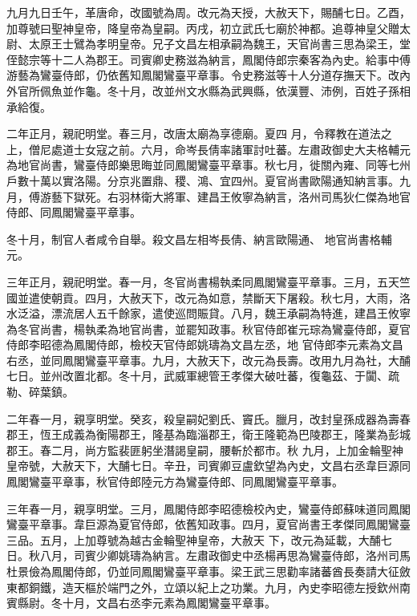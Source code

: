 \begin{pinyinscope}
 九月九日壬午，革唐命，改國號為周。改元為天授，大赦天下，賜酺七日。乙酉，加尊號曰聖神皇帝，降皇帝為皇嗣。丙戌，初立武氏七廟於神都。追尊神皇父贈太
 尉、太原王士鷿為孝明皇帝。兄子文昌左相承嗣為魏王，天官尚書三思為梁王，堂侄懿宗等十二人為郡王。司賓卿史務滋為納言，鳳閣侍郎宗秦客為內史。給事中傅游藝為鸞臺侍郎，仍依舊知鳳閣鸞臺平章事。令史務滋等十人分道存撫天下。改內外官所佩魚並作龜。冬十月，改並州文水縣為武興縣，依漢豐、沛例，百姓子孫相承給復。



 二年正月，親祀明堂。春三月，改唐太廟為享德廟。夏四
 月，令釋教在道法之上，僧尼處道士女寇之前。六月，命岑長倩率諸軍討吐蕃。左肅政御史大夫格輔元為地官尚書，鸞臺侍郎樂思晦並同鳳閣鸞臺平章事。秋七月，徙關內雍、同等七州戶數十萬以實洛陽。分京兆置鼎、稷、鴻、宜四州。夏官尚書歐陽通知納言事。九月，傅游藝下獄死。右羽林衛大將軍、建昌王攸寧為納言，洛州司馬狄仁傑為地官侍郎、同鳳閣鸞臺平章事。



 冬十月，制官人者咸令自舉。殺文昌左相岑長倩、納言歐陽通、
 地官尚書格輔元。



 三年正月，親祀明堂。春一月，冬官尚書楊執柔同鳳閣鸞臺平章事。三月，五天竺國並遣使朝貢。四月，大赦天下，改元為如意，禁斷天下屠殺。秋七月，大雨，洛水泛溢，漂流居人五千餘家，遣使巡問賑貸。八月，魏王承嗣為特進，建昌王攸寧為冬官尚書，楊執柔為地官尚書，並罷知政事。秋官侍郎崔元琮為鸞臺侍郎，夏官侍郎李昭德為鳳閣侍郎，檢校天官侍郎姚璹為文昌左丞，地
 官侍郎李元素為文昌右丞，並同鳳閣鸞臺平章事。九月，大赦天下，改元為長壽。改用九月為社，大酺七日。並州改置北都。冬十月，武威軍總管王孝傑大破吐蕃，復龜茲、于闐、疏勒、碎葉鎮。



 二年春一月，親享明堂。癸亥，殺皇嗣妃劉氏、竇氏。臘月，改封皇孫成器為壽春郡王，恆王成義為衡陽郡王，隆基為臨淄郡王，衛王隆範為巴陵郡王，隆業為彭城郡王。春二月，尚方監裴匪躬坐潛謁皇嗣，腰斬於都市。秋
 九月，上加金輪聖神皇帝號，大赦天下，大酺七日。辛丑，司賓卿豆盧欽望為內史，文昌右丞韋巨源同鳳閣鸞臺平章事，秋官侍郎陸元方為鸞臺侍郎、同鳳閣鸞臺平章事。



 三年春一月，親享明堂。三月，鳳閣侍郎李昭德檢校內史，鸞臺侍郎蘇味道同鳳閣鸞臺平章事。韋巨源為夏官侍郎，依舊知政事。四月，夏官尚書王孝傑同鳳閣鸞臺三品。五月，上加尊號為越古金輪聖神皇帝，大赦天
 下，改元為延載，大酺七日。秋八月，司賓少卿姚璹為納言。左肅政御史中丞楊再思為鸞臺侍郎，洛州司馬杜景儉為鳳閣侍郎，仍並同鳳閣鸞臺平章事。梁王武三思勸率諸蕃酋長奏請大征斂東都銅鐵，造天樞於端門之外，立頌以紀上之功業。九月，內史李昭德左授欽州南賓縣尉。冬十月，文昌右丞李元素為鳳閣鸞臺平章事。




\end{pinyinscope}
